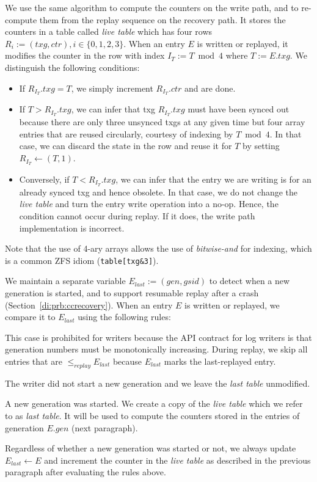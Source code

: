 \documentclass[12pt,a4paper,twoside]{book}
\begin{document}
We use the same algorithm to compute the counters on the write path, and to re-compute them from the replay sequence on the recovery path.
It stores the counters in a table called \textit{live table} which has four rows \mbox{$R_i := (txg, ctr), i \in \{0,1,2,3\}$}.
When an entry $E$ is written or replayed, it modifies the counter in the row with index $I_T := T \bmod 4$ where $T := E.txg$.
We distinguish the following conditions:
\begin{itemize}[noitemsep]
\item If $R_{I_T}.txg = T$, we simply increment $R_{I_T}.ctr$ and are done.
\item If $T > R_{I_T}.txg$, we can infer that txg $R_{I_T}.txg$ must have been synced out because there are only three unsynced txgs at any given time but four array entries that are reused circularly, courtesy of indexing by $T \bmod 4$.
In that case, we can discard the state in the row and reuse it for $T$ by setting $R_{I_T} \leftarrow (T, 1)$.
\item Conversely, if $T < R_{I_T}.txg$, we can infer that the entry we are writing is for an already synced txg and hence obsolete.
In that case, we do not change the \textit{live table} and turn the entry write operation into a no-op.
Hence, the condition cannot occur during replay. If it does, the write path implementation is incorrect.
\end{itemize}
Note that the use of 4-ary arrays allows the use of \textit{bitwise-and} for indexing, which is a common ZFS idiom (\lstinline{table[txg&3]}).

We maintain a separate variable $E_{last} := (gen, gsid)$ to detect when a new generation is started, and to support resumable replay after a crash (Section~\ref{di:prb:ccrecovery}).
When an entry $E$ is written or replayed, we compare it to $E_{last}$ using the following rules:
\begin{description}[noitemsep,leftmargin=1.5cm,labelindent=1cm]
\item[$E < E_{last}$] This case is prohibited for writers because the API contract for log writers is that generation numbers must be monotonically increasing.
  During replay, we skip all entries that are $\le_{replay} E_{last}$ because $E_{last}$ marks the last-replayed entry.
\item[$E.gen = E_{last}.gen$] The writer did not start a new generation and we leave the \textit{last table} unmodified.
\item[$E.gen > E_{last}.gen$] A new generation was started.
    We create a copy of the \textit{live table} which we refer to as \textit{last table}.
    It will be used to compute the counters stored in the entries of generation $E.gen$ (next paragraph).
\end{description}
Regardless of whether a new generation was started or not, we always update $E_{last} \leftarrow E$ and increment the counter in the \textit{live table} as described in the previous paragraph after evaluating the rules above.
\end{document}
